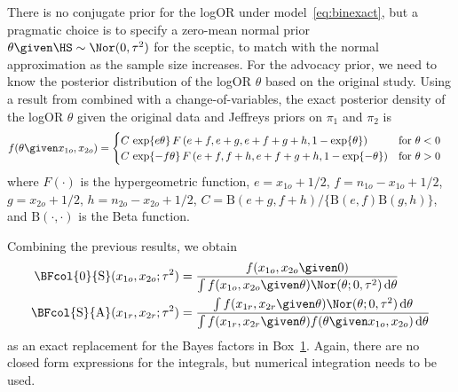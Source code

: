 There is no conjugate prior for the logOR under model~\eqref{eq:binexact}, but a
pragmatic choice is to specify a zero-mean normal prior
$\theta \given \HS \sim \Nor(0, \tau^{2})$ for the sceptic, to match with the
normal approximation as the sample size increases. For the advocacy prior, we
need to know the posterior distribution of the logOR $\theta$ based on the
original study.
Using a result from \citet{Marshall1988} combined with a change-of-variables,
the exact posterior density of the logOR $\theta$ given the original data and
Jeffreys priors on $\pi_1$ and $\pi_2$ is
\begin{align*}
  f(\theta \given x_{1o}, x_{2o}) &=
  \begin{cases}
    C \, \exp\{e \theta\} \,
    F\left(e + f, e + g, e + f + g + h, 1 - \exp\{\theta\}\right)
    & \text{for} ~ \theta < 0 \\
    C \, \exp\{-f \theta\} \,
    F\left(e + f, f + h, e + f + g + h, 1 - \exp\{-\theta\}\right)
    & \text{for} ~ \theta > 0 \\
  \end{cases}
\end{align*}
where $F(\cdot)$ is the hypergeometric function, $e = x_{1o} + 1/2$,
$f = n_{1o} - x_{1o} + 1/2$, $g = x_{2o} + 1/2$, $h = n_{2o} - x_{2o} + 1/2$,
$C = \text{B}(e + g, f + h)/\{\text{B}(e, f) \text{B}(g, h)\}$, and
$\text{B}(\cdot, \cdot)$ is the Beta function.

Combining the previous results, we obtain
\begin{align*}
  \BFcol{0}{\text{S}}(x_{1o}, x_{2o};\tau^{2})
  &= \frac{ f(x_{1o}, x_{2o} \given 0)}{\int
   f(x_{1o}, x_{2o} \given \theta)
  \Nor(\theta; 0, \tau^{2}) \, \text{d}\theta} \\
  \BFcol{\text{S}}{\text{A}}(x_{1r}, x_{2r};\tau^{2})
  &= \frac{\int f(x_{1r}, x_{2r} \given \theta)
    \Nor(\theta; 0, \tau^{2}) \, \text{d}\theta}{
    \int f(x_{1r}, x_{2r} \given \theta)
    f(\theta \given x_{1o}, x_{2o}) \, \text{d} \theta}
\end{align*}
as an exact replacement for the Bayes factors in Box~\hyperref[box:nutshell]{1}.
Again, there are no closed form expressions for the integrals, but numerical
integration needs to be used.


